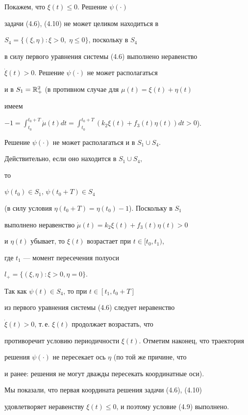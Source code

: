 %


Покажем, что $\xi(t)\le 0$. Решение $\psi(\cdot)$


задачи (4.6), (4.10) не может целиком находиться в


$S_4=\{(\xi,\eta) : \xi > 0,\; \eta \le 0\}$, поскольку в $S_4$


в силу первого уравнения системы (4.6) выполнено неравенство


$\Dot \xi(t) > 0$. Решение $\psi(\cdot)$ не может располагаться


и в $S_1 = \Bbb R_{+}^2$ (в противном случае для $\mu(t)=\xi(t) + \eta(t)$


имеем


$-1 = \int_{t_0}^{t_0+T}\Dot\mu(t) dt =


\int_{t_0}^{t_0+T}(k_2\xi(t) + f_3(t)\eta(t)) dt > 0$).


Решение $\psi(\cdot)$ не может располагаться и в $S_1\cup S_4$.


Действительно, если оно находится в $S_1\cup S_4$,


то


$\psi(t_0) \in S_1$, $\psi(t_0+T)\in S_4$


(в силу условия $\eta(t_0+T)=\eta(t_0) - 1$). Поскольку в $S_1$


выполнено неравенство $\Dot \mu(t) = k_2\xi(t) + f_3(t)\eta(t) > 0$


и $\eta(t)$ убывает, то $\xi(t)$ возрастает при $t\in [t_0,t_1)$,


где $t_1$ --- момент пересечения полуоси


$l_{+}=\{(\xi,\eta):\xi > 0, \eta = 0 \}$.


Так как $\psi(t) \in S_4$, то при $t\in [t_1, t_0 +T]$ 


из первого уравнения системы (4.6) следует неравенство


$\Dot \xi(t) > 0$, т.\,е. $\xi(t)$ продолжает возрастать, что


противоречит условию периодичности $\xi(t)$. Отметим наконец, что траектория


решения $\psi(\cdot)$ не пересекает ось $\eta$ (по той же причине, что


и ранее: решения не могут дважды пересекать координатные оси).


Мы показали, что первая координата решения задачи (4.6), (4.10)


удовлетворяет неравенству  $\xi(t) \le 0$, и поэтому условие  (4.9) выполнено.





